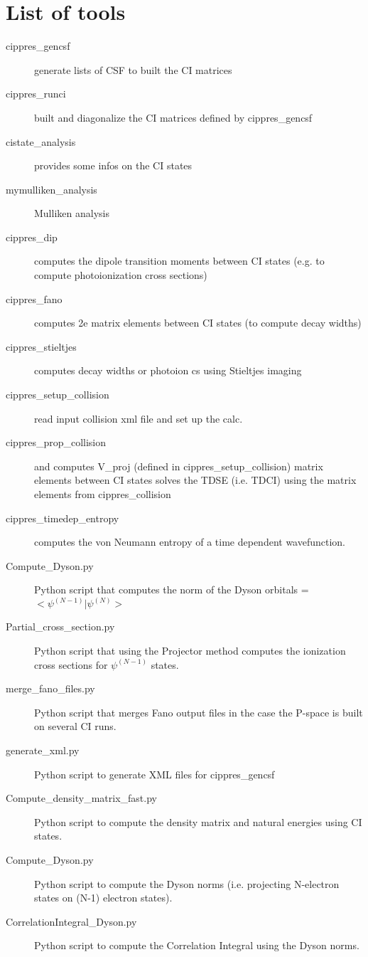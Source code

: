 \documentclass[a4paper, 10 pt]{report}
\begin{document}
\section{List of tools}
\begin{description}
	\item[cippres\_gencsf] generate lists of CSF to built the CI matrices
	\item[cippres\_runci] built and diagonalize the CI matrices defined by cippres\_gencsf
	\item[cistate\_analysis] provides some infos on the CI states
	\item[mymulliken\_analysis] Mulliken analysis
	\item[cippres\_dip] computes the dipole transition moments between CI states (e.g. to compute photoionization cross sections)
    \item[cippres\_fano] computes 2e matrix elements between CI states (to compute decay widths)
    \item[cippres\_stieltjes] computes decay widths or photoion cs using Stieltjes imaging
    \item[cippres\_setup\_collision] read input collision xml file and set up the calc.	
	\item[cippres\_prop\_collision] and computes V\_proj (defined in cippres\_setup\_collision) matrix elements between CI states solves the TDSE (i.e. TDCI) using the matrix elements from cippres\_collision
	 \item[cippres\_timedep\_entropy] computes the von Neumann entropy of a time dependent wavefunction.
	\item[Compute\_Dyson.py] Python script that computes the norm of the Dyson orbitals = $<\psi^{(N-1)}|\psi^{(N)}>$
	\item[Partial\_cross\_section.py] Python script that using the Projector method computes the ionization cross sections for $\psi^{(N-1)}$ states.
	\item[merge\_fano\_files.py]  Python script that merges Fano output files in the case the P-space is built on several CI runs.
	\item[generate\_xml.py] Python script to generate XML files for cippres\_gencsf
    \item[Compute\_density\_matrix\_fast.py] Python script to compute the density matrix and natural energies using CI states. 
    \item[Compute\_Dyson.py] Python script to compute the Dyson norms (i.e. projecting N-electron states on (N-1) electron states).
    \item[CorrelationIntegral\_Dyson.py] Python script to compute the Correlation Integral using the Dyson norms.

\end{description}
\end{document}
